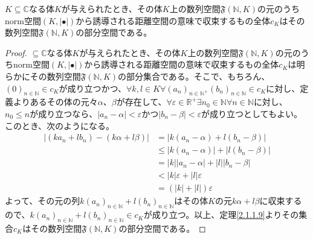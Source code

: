 \documentclass[dvipdfmx]{jsarticle}
\begin{document}
\begin{thm}\label{2.3.3.2}
$K \subseteq \mathbb{C}$なる体$K$が与えられたとき、その体$K$上の数列空間$\mathfrak{F}\left( \mathbb{N},K \right)$の元のうちnorm空間$\left( K,| \bullet | \right)$から誘導される距離空間の意味で収束するもの全体$c_{K}$はその数列空間$\mathfrak{F}\left( \mathbb{N},K \right)$の部分空間である。
\end{thm}
\begin{proof}
$\subseteq \mathbb{C}$なる体$K$が与えられたとき、その体$K$上の数列空間$\mathfrak{F}\left( \mathbb{N},K \right)$の元のうちnorm空間$\left( K,| \bullet | \right)$から誘導される距離空間の意味で収束するもの全体$c_{K}$は明らかにその数列空間$\mathfrak{F}\left( \mathbb{N},K \right)$の部分集合である。そこで、もちろん、$(0)_{n \in \mathbb{N}} \in c_{K}$が成り立つかつ、$\forall k,l \in K\forall\left( a_{n} \right)_{n \in \mathbb{N}},\left( b_{n} \right)_{n \in \mathbb{N}} \in c_{K}$に対し、定義よりあるその体の元々$\alpha$、$\beta$が存在して、$\forall\varepsilon \in \mathbb{R}^{+}\exists n_{0} \in \mathbb{N}\forall n \in \mathbb{N}$に対し、$n_{0} \leq n$が成り立つなら、$\left| a_{n} - \alpha \right| < \varepsilon$かつ$\left| b_{n} - \beta \right| < \varepsilon$が成り立つとしてもよい。このとき、次のようになる。
\begin{align*}
\left| \left( ka_{n} + lb_{n} \right) - (k\alpha + l\beta) \right| &= \left| k\left( a_{n} - \alpha \right) + l\left( b_{n} - \beta \right) \right|\\
&\leq \left| k\left( a_{n} - \alpha \right) \right| + \left| l\left( b_{n} - \beta \right) \right|\\
&= |k|\left| a_{n} - \alpha \right| + |l|\left| b_{n} - \beta \right|\\
&< |k|\varepsilon + |l|\varepsilon\\
&= \left( |k| + |l| \right)\varepsilon
\end{align*}
よって、その元の列$k\left( a_{n} \right)_{n \in \mathbb{N}} + l\left( b_{n} \right)_{n \in \mathbb{N}}$はその体$K$の元$k\alpha + l\beta$に収束するので、$k\left( a_{n} \right)_{n \in \mathbb{N}} + l\left( b_{n} \right)_{n \in \mathbb{N}} \in c_{K}$が成り立つ。以上、定理\ref{2.1.1.9}よりその集合$c_{K}$はその数列空間$\mathfrak{F}\left( \mathbb{N},K \right)$の部分空間である。
\end{proof}
\end{document}

